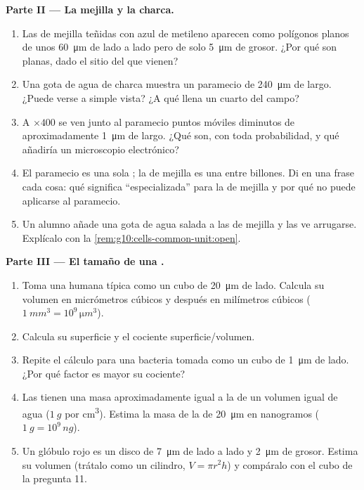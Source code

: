 \begin{problem}
\medskip
\noindent\textbf{Parte II --- La mejilla y la charca.}
\begin{enumerate}[resume]
  \item Las  de mejilla teñidas con azul de metileno aparecen
        como polígonos planos de unos \qty{60}{\micro m} de lado a lado
        pero de solo \qty{5}{\micro m} de grosor. ¿Por qué son planas,
        dado el sitio del que vienen?
  \item Una gota de agua de charca muestra un paramecio de
        \qty{240}{\micro m} de largo. ¿Puede verse a simple vista? ¿A
        qué  llena un cuarto del campo?
  \item A $\times 400$ se ven junto al paramecio puntos móviles
        diminutos de aproximadamente \qty{1}{\micro m} de largo. ¿Qué
        son, con toda probabilidad, y qué añadiría un microscopio
        electrónico?
  \item El paramecio es una sola ; la de mejilla es una entre
        billones. Di en una frase cada cosa: qué significa
        ``especializada'' para la  de mejilla y por qué no puede
        aplicarse al paramecio.
  \item Un alumno añade una gota de agua salada a las  de
        mejilla y las ve arrugarse. Explícalo con la
        \cref{rem:g10:cells-common-unit:open}.
\end{enumerate}

\medskip
\noindent\textbf{Parte III --- El tamaño de una .}
\begin{enumerate}[resume]
  \item Toma una  humana típica como un cubo de
        \qty{20}{\micro m} de lado. Calcula su volumen en micrómetros
        cúbicos y después en milímetros cúbicos
        ($\qty{1}{mm^3} = 10^9\,\unit{\micro m^3}$).
  \item Calcula su superficie y el cociente superficie/volumen.
  \item Repite el cálculo para una bacteria tomada como un cubo de
        \qty{1}{\micro m} de lado. ¿Por qué factor es mayor su
        cociente?
  \item Las  tienen una masa aproximadamente igual a la de un
        volumen igual de agua ($\qty{1}{g}$ por \unit{cm^3}). Estima la
        masa de la  de \qty{20}{\micro m} en nanogramos
        ($\qty{1}{g} = 10^9\,\unit{ng}$).
  \item Un glóbulo rojo es un disco de \qty{7}{\micro m} de lado a lado
        y \qty{2}{\micro m} de grosor. Estima su volumen (trátalo como
        un cilindro, $V = \pi r^2 h$) y compáralo con el cubo de la
        pregunta 11.
\end{enumerate}


\end{problem}

